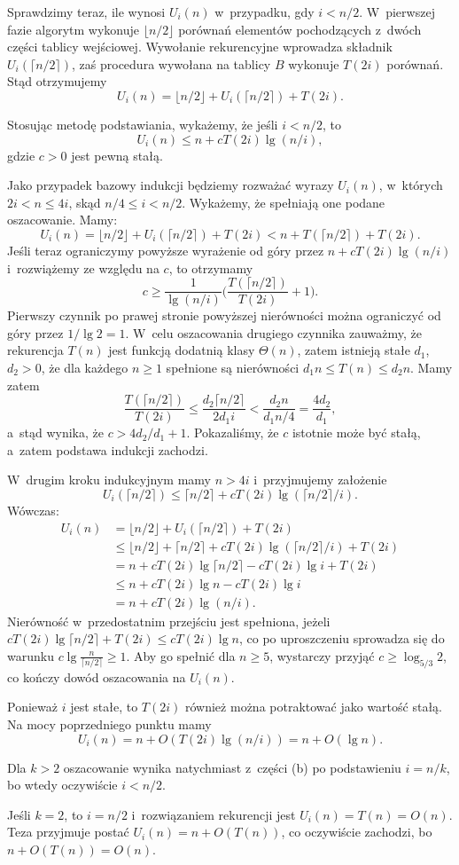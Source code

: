 Sprawdzimy teraz, ile wynosi $U_i(n)$ w~przypadku, gdy $i<n/2$.
W~pierwszej fazie algorytm wykonuje $\lfloor n/2\rfloor$ porównań elementów pochodzących z~dwóch części tablicy wejściowej.
Wywołanie rekurencyjne wprowadza składnik $U_i(\lceil n/2\rceil)$, zaś procedura  wywołana na tablicy $B$ wykonuje $T(2i)$ porównań.
Stąd otrzymujemy
\[
    U_i(n) = \lfloor n/2\rfloor+U_i(\lceil n/2\rceil)+T(2i).
\]

\subproblem %
Stosując metodę podstawiania, wykażemy, że jeśli $i<n/2$, to
\[
	U_i(n) \le n+cT(2i)\lg(n/i),
\]
gdzie $c>0$ jest pewną stałą.

Jako przypadek bazowy indukcji będziemy rozważać wyrazy $U_i(n)$, w~których $2i<n\le4i$, skąd $n/4\le i<n/2$.
Wykażemy, że spełniają one podane oszacowanie.
Mamy:
\[
    U_i(n) = \lfloor n/2\rfloor+U_i(\lceil n/2\rceil)+T(2i) < n+T(\lceil n/2\rceil)+T(2i).
\]
Jeśli teraz ograniczymy powyższe wyrażenie od góry przez $n+cT(2i)\lg(n/i)$ i~rozwiążemy ze względu na $c$, to otrzymamy
\[
    c \ge \frac{1}{\lg(n/i)}\biggl(\frac{T(\lceil n/2\rceil)}{T(2i)}+1\biggr).
\]
Pierwszy czynnik po prawej stronie powyższej nierówności można ograniczyć od góry przez $1/\lg2=1$.
W~celu oszacowania drugiego czynnika zauważmy, że rekurencja $T(n)$ jest funkcją dodatnią klasy $\Theta(n)$, zatem istnieją stałe $d_1$, $d_2>0$, że dla każdego $n\ge1$ spełnione są nierówności $d_1n\le T(n)\le d_2n$.
Mamy zatem
\[
    \frac{T(\lceil n/2\rceil)}{T(2i)} \le \frac{d_2\lceil n/2\rceil}{2d_1i} < \frac{d_2n}{d_1n/4} = \frac{4d_2}{d_1},
\]
a~stąd wynika, że $c>4d_2/d_1+1$.
Pokazaliśmy, że $c$ istotnie może być stałą, a~zatem podstawa indukcji zachodzi.

W~drugim kroku indukcyjnym mamy $n>4i$ i~przyjmujemy założenie
\[
    U_i(\lceil n/2\rceil) \le \lceil n/2\rceil+cT(2i)\lg(\lceil n/2\rceil/i).
\]
Wówczas:
\begin{align*}
    U_i(n) &= \lfloor n/2\rfloor+U_i(\lceil n/2\rceil)+T(2i) \\
	&\le \lfloor n/2\rfloor+\lceil n/2\rceil+cT(2i)\lg(\lceil n/2\rceil/i)+T(2i) \\
	&= n+cT(2i)\lg\lceil n/2\rceil-cT(2i)\lg i+T(2i) \\
	&\le n+cT(2i)\lg n-cT(2i)\lg i \\
    &= n+cT(2i)\lg(n/i).
\end{align*}
Nierówność w~przedostatnim przejściu jest spełniona, jeżeli $cT(2i)\lg\lceil n/2\rceil+T(2i)\le cT(2i)\lg n$, co po uproszczeniu sprowadza się do warunku $c\lg\frac{n}{\lceil n/2\rceil}\ge1$.
Aby go spełnić dla $n\ge5$, wystarczy przyjąć $c\ge\log_{5/3}2$, co kończy dowód oszacowania na $U_i(n)$.

\subproblem %
Ponieważ $i$ jest stałe, to $T(2i)$ również można potraktować jako wartość stałą.
Na mocy poprzedniego punktu mamy
\[
	U_i(n) = n+O(T(2i)\lg(n/i)) = n+O(\lg n).
\]

\subproblem %
Dla $k>2$ oszacowanie wynika natychmiast z~części (b) po podstawieniu $i=n/k$, bo wtedy oczywiście $i<n/2$.

Jeśli $k=2$, to $i=n/2$ i~rozwiązaniem rekurencji jest $U_i(n)=T(n)=O(n)$.
Teza przyjmuje postać $U_i(n)=n+O(T(n))$, co oczywiście zachodzi, bo $n+O(T(n))=O(n)$.
